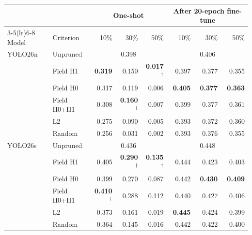 \begin{tabular}{llrrrrrr}
\toprule
 & & \multicolumn{3}{c}{One-shot} & \multicolumn{3}{c}{After 20-epoch fine-tune} \\
\cmidrule(lr){3-5}\cmidrule(lr){6-8}
Model & Criterion & 10\% & 30\% & 50\% & 10\% & 30\% & 50\% \\
\midrule
YOLO26n & Unpruned & \multicolumn{3}{c}{0.398} & \multicolumn{3}{c}{0.406} \\
 & Field H1 & \textbf{0.319} & 0.150 & \textbf{0.017}$^\dagger$ & 0.397 & 0.377 & 0.355 \\
 & Field H0 & 0.317 & 0.119 & 0.006 & \textbf{0.405} & \textbf{0.377} & \textbf{0.363} \\
 & Field H0+H1 & 0.308 & \textbf{0.160}$^\dagger$ & 0.007 & 0.399 & 0.377 & 0.361 \\
 & L2 & 0.275 & 0.090 & 0.005 & 0.393 & 0.372 & 0.360 \\
 & Random & 0.256 & 0.031 & 0.002 & 0.393 & 0.376 & 0.355 \\
\midrule
YOLO26s & Unpruned & \multicolumn{3}{c}{0.436} & \multicolumn{3}{c}{0.448} \\
 & Field H1 & 0.405 & \textbf{0.290}$^\dagger$ & \textbf{0.135}$^\dagger$ & 0.444 & 0.423 & 0.403 \\
 & Field H0 & 0.399 & 0.270 & 0.087 & 0.442 & \textbf{0.430} & \textbf{0.409} \\
 & Field H0+H1 & \textbf{0.410}$^\dagger$ & 0.288 & 0.112 & 0.440 & 0.427 & 0.406 \\
 & L2 & 0.373 & 0.161 & 0.019 & \textbf{0.445} & 0.424 & 0.399 \\
 & Random & 0.364 & 0.145 & 0.016 & 0.442 & 0.422 & 0.400 \\
\bottomrule
\end{tabular}
